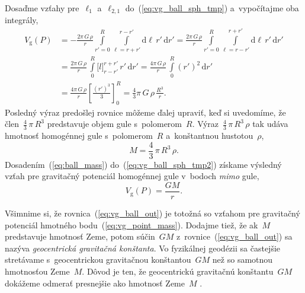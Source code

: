 \documentclass[a4paper, 12pt]{book}
\newcommand{\diff}{\mathrm d}
\newcommand{\gidx}{\mathrm g}
\begin{document}
Dosaďme vzťahy pre~$\ell_1$ a~$\ell_{2,1}$ do~(\ref{eq:vg_ball_sph_tmp}) 
a~vypočítajme oba integrály,
%
\begin{equation}
\label{eq:vg_ball_sph_tmp2}
\begin{split}
V_\gidx(P) &= -\frac{2\pi \, G \, \rho}{r} \int\limits_{r' = 0}^R 
\int\limits_{\ell = r + r'}^{r - r'} \diff \ell \, r' \, \diff r'
%
= \frac{2\pi \, G \, \rho}{r} \int\limits_{r' = 0}^R \int\limits_{\ell 
= r - r'}^{r + r'} \diff \ell \, r' \, \diff r'\\
%
&= \frac{2\pi \, G \, \rho}{r} \,  \int\limits_{0}^R \big[ l \big]_{r - r'}^{r 
+ r'} \, r'  \, \diff r'
%
= \frac{4\pi \, G \, \rho}{r} \, \int\limits_{0}^R (r')^2 \, \diff r'\\
%
&=  \frac{4\pi \, G \, \rho}{r} \left[ \frac{(r')^3}{3} \right]_{0}^{R} 
= \frac{4}{3}\pi \, G \, \rho \, \frac{R^3}{r}{.}
\end{split}
\end{equation}
%
Posledný výraz predošlej rovnice môžeme ďalej upraviť, keď si uvedomíme, že 
člen~$\frac{4}{3} \, \pi \, R^3$ predstavuje objem gule s~polomerom~$R$.  
Výraz~$\frac{4}{3} \, \pi \, R^3 \, \rho$ tak udáva hmotnosť homogénnej gule 
s~polomerom~$R$ a~konštantnou hustotou~$\rho$,
%
\begin{equation}
\label{eq:ball_mass}
M = \frac{4}{3} \, \pi \, R^3 \, \rho{.}
\end{equation}
%
Dosadením~(\ref{eq:ball_mass}) do~(\ref{eq:vg_ball_sph_tmp2}) získame výsledný 
vzťah pre gravitačný potenciál homogénnej gule v~bodoch \emph{mimo} gule,
%
\begin{equation}
\label{eq:vg_ball_out}
V_\gidx(P) = \frac{GM}{r}{.}
\end{equation}

Všimnime si, že rovnica~(\ref{eq:vg_ball_out}) je totožná so vzťahom pre 
gravitačný potenciál hmotného bodu~(\ref{eq:vg_point_mass}).  Dodajme tiež, že 
ak~$M$ predstavuje hmotnosť Zeme, potom súčin~$GM$ 
z~rovnice~(\ref{eq:vg_ball_out}) sa nazýva \emph{geocentrická gravitačná 
konštanta}.  Vo fyzikálnej geodézii sa častejšie stretávame s~geocentrickou 
gravitačnou konštantou~$GM$ než so samotnou hmotnosťou Zeme~$M$.  Dôvod je ten, 
že geocentrickú gravitačnú konštantu~$GM$ dokážeme odmerať presnejšie ako 
hmotnosť Zeme~$M$ \parencite{Pick2000}.
\end{document}
